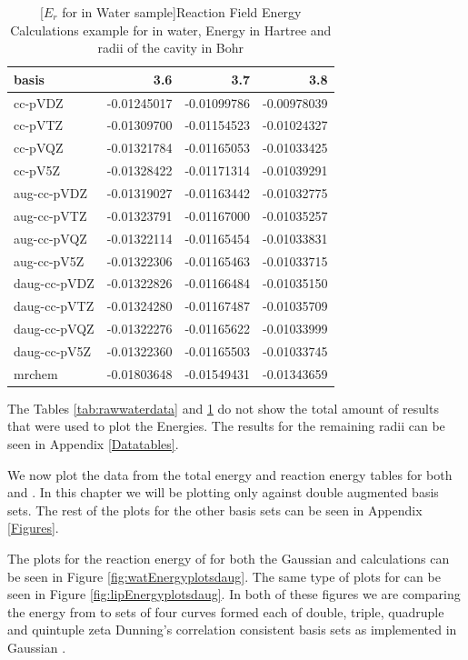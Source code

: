 \documentclass[../master_thesis.tex]{subfiles}
\begin{document}
\begin{table}[htbp]
\caption{[$E_r$ for  in Water sample]{Reaction Field Energy Calculations example for  in water, Energy in Hartree and radii of the cavity in Bohr}}
\begin{tabular}{|l|r|r|r|}
basis & 3.6 & 3.7 & 3.8 \\ \hline
cc-pVDZ & -0.01245017 & -0.01099786 & -0.00978039 \\
cc-pVTZ & -0.01309700 & -0.01154523 & -0.01024327 \\
cc-pVQZ & -0.01321784 & -0.01165053 & -0.01033425 \\
cc-pV5Z & -0.01328422 & -0.01171314 & -0.01039291 \\ \hline
aug-cc-pVDZ & -0.01319027 & -0.01163442 & -0.01032775 \\
aug-cc-pVTZ & -0.01323791 & -0.01167000 & -0.01035257 \\
aug-cc-pVQZ & -0.01322114 & -0.01165454 & -0.01033831 \\
aug-cc-pV5Z & -0.01322306 & -0.01165463 & -0.01033715 \\ \hline
daug-cc-pVDZ & -0.01322826 & -0.01166484 & -0.01035150 \\
daug-cc-pVTZ & -0.01324280 & -0.01167487 & -0.01035709 \\
daug-cc-pVQZ & -0.01322276 & -0.01165622 & -0.01033999 \\
daug-cc-pV5Z & -0.01322360 & -0.01165503 & -0.01033745 \\ \hline
mrchem & -0.01803648 & -0.01549431 & -0.01343659 \\
\end{tabular}
\label{tab:Erwatdata}
\end{table}


 The Tables \ref{tab:rawwaterdata} and \ref{tab:Erwatdata} do not show the total
 amount of results that were used to plot the Energies. The results for the remaining
 radii can be seen in Appendix \ref{Datatables}.

We now plot the data from the total energy and reaction energy tables for
both  and . In this chapter we will be plotting only against
double augmented basis sets. The rest of the plots for the other basis sets can
be seen in Appendix \ref{Figures}.

The plots for the reaction energy of  for
both the Gaussian and  \mrchem calculations can be seen in Figure \ref{fig:watEnergyplotsdaug}.
The same type of plots for  can be seen in Figure \ref{fig:lipEnergyplotsdaug}.
In both of these figures we are comparing the energy from \mrchem to sets of four
curves formed each of double, triple, quadruple and quintuple zeta Dunning's correlation
consistent basis sets\cite{doi:10.1063/1.456153} as implemented in Gaussian \cite{G09}.
\end{document}
